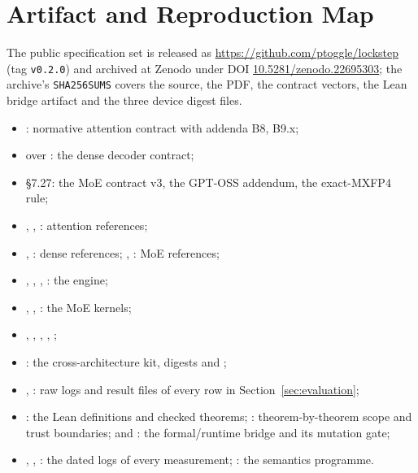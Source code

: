 \documentclass{article}
\begin{document}
\section{Artifact and Reproduction Map}
\label{app:artifact}

The public specification set is released as \url{https://github.com/ptoggle/lockstep} (tag
\texttt{v0.2.0}) and archived at Zenodo under DOI \href{https://doi.org/10.5281/zenodo.22695303}{10.5281/zenodo.22695303};
the archive's \texttt{SHA256SUMS} covers the source, the PDF, the contract vectors, the Lean bridge
artifact and the three device digest files.

\begin{itemize}
  \item {}: normative attention contract with addenda B8, B9.x;
  \item {} over : the dense decoder contract;
  \item {} \S7.27: the MoE contract v3, the GPT-OSS addendum, the exact-MXFP4 rule;
  \item {}, , : attention references;
  \item {}, : dense references; , : MoE references;
  \item {}, , , : the engine;
  \item {}, , : the MoE kernels;
  \item {}, , , , ;
  \item {}: the cross-architecture kit, digests and ;
  \item {}, : raw logs and result files of every row in Section~\ref{sec:evaluation};
  \item {}: the Lean definitions and checked theorems; : theorem-by-theorem scope and trust boundaries;  and : the formal/runtime bridge and its mutation gate;
  \item {}, , : the dated logs of every measurement; : the semantics programme.
\end{itemize}
\end{document}
